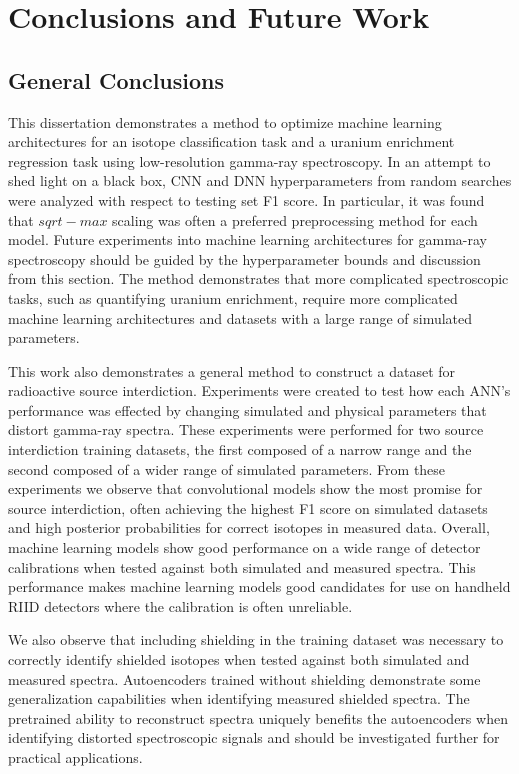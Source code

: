 \chapter{Conclusions and Future Work}

\section{General Conclusions}

This dissertation demonstrates a method to optimize machine learning architectures for an isotope classification task and a uranium enrichment regression task using low-resolution gamma-ray spectroscopy. In an attempt to shed light on a black box, CNN and DNN hyperparameters from random searches were analyzed with respect to testing set F1 score. In particular, it was found that $sqrt-max$ scaling was often a preferred preprocessing method for each model. Future experiments into machine learning architectures for gamma-ray spectroscopy should be guided by the hyperparameter bounds and discussion from this section. The method demonstrates that more complicated spectroscopic tasks, such as quantifying uranium enrichment, require more complicated machine learning architectures and datasets with a large range of simulated parameters.

This work also demonstrates a general method to construct a dataset for radioactive source interdiction. Experiments were created to test how each ANN's performance was effected by changing simulated and physical parameters that distort gamma-ray spectra. These experiments were performed for two source interdiction training datasets, the first composed of a narrow range and the second composed of a wider range of simulated parameters. From these experiments we observe that convolutional models show the most promise for source interdiction, often achieving the highest F1 score on simulated datasets and high posterior probabilities for correct isotopes in measured data. Overall, machine learning models show good performance on a wide range of detector calibrations when tested against both simulated and measured spectra. This performance makes machine learning models good candidates for use on handheld RIID detectors where the calibration is often unreliable.

We also observe that including shielding in the training dataset was necessary to correctly identify shielded isotopes when tested against both simulated and measured spectra. Autoencoders trained without shielding demonstrate some generalization capabilities when identifying measured shielded spectra. The pretrained ability to reconstruct spectra uniquely benefits the autoencoders when identifying distorted spectroscopic signals and should be investigated further for practical applications.

